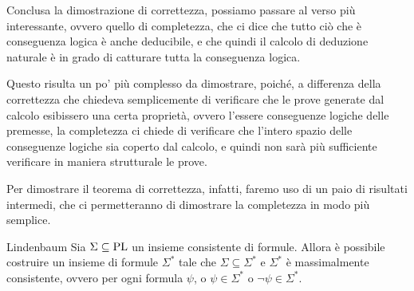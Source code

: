 Conclusa la dimostrazione di correttezza, possiamo passare al verso più interessante, ovvero quello di completezza, che ci dice che tutto ciò che è conseguenza logica è anche deducibile, e che quindi il calcolo di deduzione naturale è in grado di catturare tutta la conseguenza logica.

Questo risulta un po' più complesso da dimostrare, poiché, a differenza della correttezza che chiedeva semplicemente di verificare che le prove generate dal calcolo esibissero una certa proprietà, ovvero l'essere conseguenze logiche delle premesse, la completezza ci chiede di verificare che l'intero spazio delle conseguenze logiche sia coperto dal calcolo, e quindi non sarà più sufficiente verificare in maniera strutturale le prove.

Per dimostrare il teorema di correttezza, infatti, faremo uso di un paio di risultati intermedi, che ci permetteranno di dimostrare la completezza in modo più semplice.

\begin{lemma}[namedlabel={lem:lindenbaum}{Lindenbaum}]{Lindenbaum}
  Sia \(\Sigma\subseteq\operatorname{PL}\) un insieme consistente di formule. Allora è possibile costruire un insieme di formule \(\Sigma^*\) tale che \(\Sigma\subseteq\Sigma^*\) e \(\Sigma^*\) è massimalmente consistente, ovvero per ogni formula \(\psi\), o \(\psi\in\Sigma^*\) o \(\neg\psi\in\Sigma^*\).
\end{lemma}

